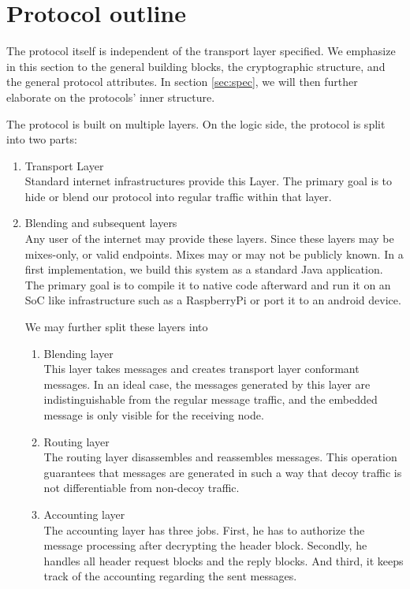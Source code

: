 \section{Protocol outline}
The protocol itself is independent of the transport layer specified. We emphasize in this section to the general building blocks, the cryptographic structure, and the general protocol attributes. In section \ref{sec:spec}, we will then further elaborate on the protocols' inner structure.

The protocol is built on multiple layers. On the logic side, the protocol is split into two parts:
\begin{enumerate}
	\item Transport Layer\\
	Standard internet infrastructures provide this Layer. The primary goal is to hide or blend our protocol into regular traffic within that layer.
	\item Blending and subsequent layers\\
	Any user of the internet may provide these layers. Since these layers may be mixes-only, or valid endpoints. Mixes may or may not be publicly known. In a first implementation, we build this system as a standard Java application. The primary goal is to compile it to native code afterward and run it on an SoC like infrastructure such as a RaspberryPi or port it to an android device.
	
	We may further split these layers into
	\begin{enumerate}
		\item Blending layer\\
		This layer takes messages and creates transport layer conformant messages. In an ideal case, the messages generated by this layer are indistinguishable from the regular message traffic, and the embedded message is only visible for the receiving node.
		\item Routing layer\\
		The routing layer disassembles and reassembles messages. This operation guarantees that messages are generated in such a way that decoy traffic is not differentiable from non-decoy traffic.
		\item Accounting layer\\
		The accounting layer has three jobs. First, he has to authorize the message processing after decrypting the header block. Secondly, he handles all header request blocks and the reply blocks. And third, it keeps track of the accounting regarding the sent messages.    
	\end{enumerate}
\end{enumerate}


